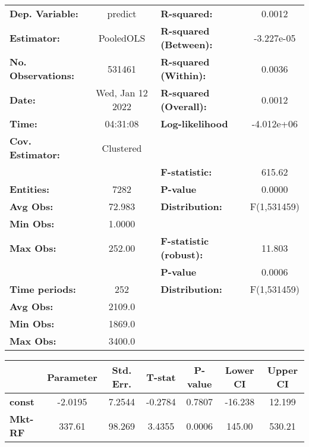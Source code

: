 \begin{center}
\begin{tabular}{lclc}
\toprule
\textbf{Dep. Variable:}    &      predict       & \textbf{  R-squared:         }   &      0.0012      \\
\textbf{Estimator:}        &     PooledOLS      & \textbf{  R-squared (Between):}  &    -3.227e-05    \\
\textbf{No. Observations:} &       531461       & \textbf{  R-squared (Within):}   &      0.0036      \\
\textbf{Date:}             &  Wed, Jan 12 2022  & \textbf{  R-squared (Overall):}  &      0.0012      \\
\textbf{Time:}             &      04:31:08      & \textbf{  Log-likelihood     }   &    -4.012e+06    \\
\textbf{Cov. Estimator:}   &     Clustered      & \textbf{                     }   &                  \\
\textbf{}                  &                    & \textbf{  F-statistic:       }   &      615.62      \\
\textbf{Entities:}         &        7282        & \textbf{  P-value            }   &      0.0000      \\
\textbf{Avg Obs:}          &       72.983       & \textbf{  Distribution:      }   &   F(1,531459)    \\
\textbf{Min Obs:}          &       1.0000       & \textbf{                     }   &                  \\
\textbf{Max Obs:}          &       252.00       & \textbf{  F-statistic (robust):} &      11.803      \\
\textbf{}                  &                    & \textbf{  P-value            }   &      0.0006      \\
\textbf{Time periods:}     &        252         & \textbf{  Distribution:      }   &   F(1,531459)    \\
\textbf{Avg Obs:}          &       2109.0       & \textbf{                     }   &                  \\
\textbf{Min Obs:}          &       1869.0       & \textbf{                     }   &                  \\
\textbf{Max Obs:}          &       3400.0       & \textbf{                     }   &                  \\
\bottomrule
\end{tabular}
\begin{tabular}{lcccccc}
                & \textbf{Parameter} & \textbf{Std. Err.} & \textbf{T-stat} & \textbf{P-value} & \textbf{Lower CI} & \textbf{Upper CI}  \\
\midrule
\textbf{const}  &      -2.0195       &       7.2544       &     -0.2784     &      0.7807      &      -16.238      &       12.199       \\
\textbf{Mkt-RF} &       337.61       &       98.269       &      3.4355     &      0.0006      &       145.00      &       530.21       \\
\bottomrule
\end{tabular}
\end{center}
